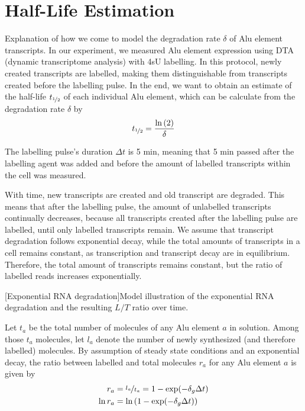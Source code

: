 \section{Half-Life Estimation}

Explanation of how we come to model the degradation rate
$\delta$ of Alu
element transcripts. In our experiment, we measured Alu element expression using
DTA (dynamic transcriptome analysis) with 4sU labelling. In this protocol, newly
created transcripts are labelled, making them distinguishable from transcripts
created before the labelling pulse. In the end, we want to obtain an estimate of
the half-life $t_{\nicefrac{1}{2}}$ of each individual Alu element, which can be
calculate from the degradation rate
$\delta$ by
\begin{equation*}
t_{\nicefrac{1}{2}}=\frac{\ln\left(2\right)}{\delta}
\end{equation*}

\noindent The labelling pulse's duration $\Delta t$ is 5 min, meaning that 5 min
passed after the labelling agent was added and before the amount of labelled
transcripts within the cell was measured.

With time, new transcripts are created and old transcript are degraded. This
means that after the labelling pulse, the amount of unlabelled transcripts
continually decreases, because all transcripts created after the labelling pulse
are labelled, until only labelled transcripts remain. We assume that transcript
degradation follows exponential decay, while the total amounts of transcripts
in a cell remains constant, as transcription and transcript decay are in
equilibrium. Therefore, the total amount of transcripts remains constant, but
the ratio of labelled reads increases exponentially.

\bigbreak
\noindent\begin{minipage}{\textwidth}
\centering

\vspace{-\ht\strutbox}
[Exponential RNA degradation]{Model illustration of the
exponential RNA degradation and the resulting $L/T$ ratio over time.}
\label{fig:expdecay}
\end{minipage}
\bigbreak

\noindent Let $t_{a}$ be the total number of molecules of any Alu element $a$ in
solution. Among those $t_{a}$ molecules, let $l_{a}$ denote the number of newly
synthesized (and therefore labelled) molecules. By assumption of steady state
conditions and an exponential decay, the ratio between labelled and total
molecules $r_{a}$ for any Alu element $a$ is given by
\begin{align*}
  r_{a}     &= \nicefrac{l_{a}}{t_{a}}=1-\exp(-\delta_{g}\Delta t)
\\ \ln r_{a} &= \ln\left(1-\exp(-\delta_{g}\Delta t)\right)
\end{align*}

